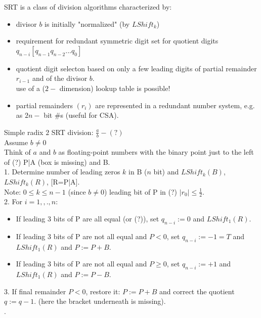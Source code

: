 SRT is a class of division algorithms characterized by: \\
\begin{itemize}
    \item divisor $b$ is initially "normalized" (by $LShift_k$)
    \item requirement for redundant symmetric digit set for quotient digits $q_{n-i} [q_{n-1}q_{n-2}...q_{0}]$
    \item quotient digit selecton based on only a few leading digits of partial remainder $r_{i-1}$ and of the divisor $b$. \\
    \implies use of a ($2-$ dimension) lookup table is possible!\\
    \item partial remainders $(r_i)$ are represented in a redundant number system, e.g. as $2 n-$ bit #s (useful for CSA). \\
\end{itemize}

Simple radix $2$ SRT division: $\frac{a}{b}-(?)$ \\
Assume $b\not = 0$ \\
Think of $a$ and $b$ as floating-point numbers with the binary point just to the left of (?) P|A (box is missing) and B. \\

1. Determine number of leading zeros $k$ in B ($n$ bit) and $LShift_k(B)$, $LShift_k(R)$, [R=P|A].\\

Note: $0\le k\le n-1$ (since $b\not =0$) \implies leading bit of P in (?) \implies $|r_0|\le \frac{1}{2}$. \\

2. For $i=1,,.,n$:\\
\begin{itemize}
    \item If leading $3$ bits of P are all equal (or (?)), set $q_{n-i}:=0$ and $LShift_1(R)$.
    \item If leading $3$ bits of P are not all equal and $P<0$, set $q_{n-i}:=-1=T$ and $LShift_1(R)$ and $P:=P+B$.
    \item If leading $3$ bits of P are not all equal and $P\ge 0$, set $q_{n-i}:=+1$ and $LShift_1(R)$ and $P:=P-B$.
\end{itemize}

3. If final remainder $P<0$, restore it: $P:=P+B$ and correct the quotient $q:=q-1$. (here the bracket underneath is missing). \\
[substraction of $1$ in last position $a_0$]. \\

